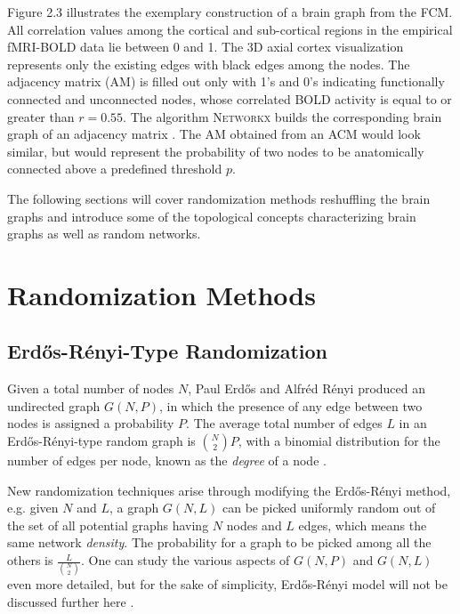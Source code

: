 Figure 2.3 illustrates the exemplary construction of a brain graph from the FCM. All correlation values among the cortical and sub-cortical regions in the empirical fMRI-BOLD data lie between 0 and 1. The 3D axial cortex visualization represents only the existing edges with black edges among the nodes. The adjacency matrix (AM) is filled out only with 1's and 0's indicating functionally connected and unconnected nodes, whose correlated BOLD activity is equal to or greater than $r=0.55$. The algorithm \textsc{Networkx} builds the corresponding brain graph of an adjacency matrix \citep{XYZNETW}. The AM obtained from an ACM would look similar, but would represent the probability of two nodes to be anatomically connected above a predefined threshold $p$. 

The following sections will cover randomization methods reshuffling the brain graphs and introduce some of the topological concepts characterizing brain graphs as well as random networks.



\section{Randomization Methods}





\subsection{Erd\H{o}s-R\'{e}nyi-Type Randomization}

Given a total number of nodes $N$, Paul Erd\H{o}s and Alfr\'{e}d R\'{e}nyi produced an undirected graph $G(N,P)$, in which the presence of any edge between two nodes is assigned a probability $P$. 
The average total number of edges $L$ in an  Erd\H{o}s-R\'{e}nyi-type random graph is $\binom {N} {2}P$, with a binomial distribution for the number of edges per node, known as the \textit{degree} of a node \citep{XYZERD}. 

New randomization techniques arise through modifying the Erd\H{o}s-R\'{e}nyi method, e.g. given $N$ and $L$, a graph $G(N,L)$ can be picked uniformly random out of the set of all potential graphs having $N$ nodes and $L$ edges, which means the same network \textit{density}. The probability for a graph to be picked among all the others is $\frac{L}{\binom {N}{2}}  $. One can study the various aspects of $G(N,P)$ and $G(N,L)$ even more detailed, but for the sake of simplicity, Erd\H{o}s-R\'{e}nyi model will not be discussed further here \citep{XYZERD, NEW10}.

